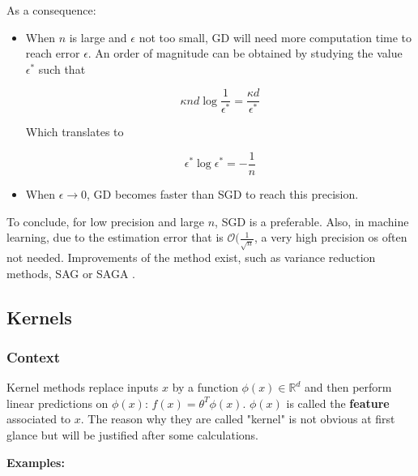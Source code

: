 \documentclass[
10pt, %
a4paper, %
oneside, %
headinclude,footinclude, %
BCOR5mm, %
]{scrartcl}
\begin{document}
As a consequence:
\begin{itemize}
    \item When $n$ is large and $\epsilon$ not too small, GD will need more computation time to reach error $\epsilon$. An order of magnitude can be obtained by studying the value $\epsilon^*$ such that

	\begin{equation*}
	   \kappa nd \log \frac{1}{\epsilon^*}  = \frac{\kappa d}{\epsilon^*} 
	\end{equation*}

	Which translates to

	\begin{equation*}
	    \epsilon^* \log \epsilon^* = -\frac{1}{n}  
	\end{equation*}
    \item When $\epsilon \rightarrow 0$, GD becomes faster than SGD to reach this precision.
\end{itemize}

To conclude, for low precision and large $n$, SGD is a preferable. Also, in
machine learning, due to the estimation error that is $ \mathcal{O} (
\frac{1}{\sqrt{n} } $, a very high precision os often not needed. Improvements
of the method exist, such as variance reduction methods, SAG or SAGA \cite[]{Schmidt2013}. 

\subsection{\large\color{MidnightBlue}Kernels}

\subsubsection{\large\color{Periwinkle}Context}

Kernel methods replace inputs $x$ by a function $\phi(x)\in \mathbb{R}^d$ and then perform linear predictions on $\phi(x)$: $f(x) = \theta^T\phi(x)$. $\phi(x)$ is called the \textbf{{feature}} associated to $x$. The reason why they are called "kernel" is not obvious at first glance but will be justified after some calculations.

\textbf{{Examples:}} 
\end{document}
